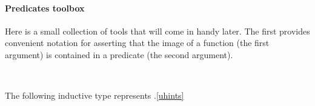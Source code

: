\paragraph*{Predicates toolbox}
Here is a small collection of tools that will come in handy later. The first provides convenient notation for asserting that the image of a function (the first argument) is contained in a predicate (the second argument).
\ccpad
\begin{code}
\>[1]\AgdaSpace{}%
\AgdaSymbol{:}\AgdaSpace{}%
\AgdaSymbol{(}\AgdaSpace{}%
\AgdaSpace{}%
\AgdaSymbol{)}\AgdaSpace{}%
\AgdaSpace{}%
\AgdaSpace{}%
\AgdaSpace{}%
\AgdaSpace{}%
\AgdaSpace{}%
\AgdaSpace{}%
\AgdaSpace{}%
\AgdaSpace{}%
\<%
\\
%
\>[1]\AgdaSpace{}%
\AgdaSpace{}%
\AgdaSpace{}%
\AgdaSpace{}%
\AgdaSymbol{=}\AgdaSpace{}%
\AgdaSpace{}%
\AgdaSpace{}%
\AgdaSpace{}%
\AgdaSpace{}%
\AgdaSpace{}%
\AgdaSpace{}%
\<%
\end{code}
\ccpad
The following inductive type represents .\cref{uhints}
\ccpad
\begin{code}
\>[0]\AgdaSpace{}%
\AgdaSpace{}%
\AgdaSymbol{\{}\AgdaSpace{}%
\AgdaSpace{}%
\AgdaSymbol{:}\AgdaSpace{}%
\AgdaSymbol{\}(}\AgdaSpace{}%
\AgdaSymbol{:}\AgdaSpace{}%
\AgdaSpace{}%
\AgdaSymbol{)}\AgdaSpace{}%
\AgdaSymbol{(}\AgdaSpace{}%
\AgdaSymbol{:}\AgdaSpace{}%
\AgdaSpace{}%
\AgdaSymbol{)}\AgdaSpace{}%
\AgdaSymbol{:}\AgdaSpace{}%
\AgdaSpace{}%
\AgdaSpace{}%
\AgdaSpace{}%
\AgdaSpace{}%
\<%
\\
\>[0][@{}l@{\AgdaIndent{0}}]%
\>[1]\AgdaSpace{}%
\AgdaSymbol{:}\AgdaSpace{}%
\AgdaSymbol{(}\AgdaSpace{}%
\AgdaSymbol{:}\AgdaSpace{}%
\AgdaSymbol{)}\AgdaSpace{}%
\AgdaSpace{}%
\AgdaSpace{}%
\AgdaSpace{}%
\<%
\\
%
\>[1]\AgdaSpace{}%
\AgdaSymbol{:}\AgdaSpace{}%
\AgdaSymbol{(}\AgdaSpace{}%
\AgdaSymbol{:}\AgdaSpace{}%
\AgdaSymbol{)}\AgdaSpace{}%
\AgdaSpace{}%
\AgdaSpace{}%
\AgdaSpace{}%
\<%
\end{code}
